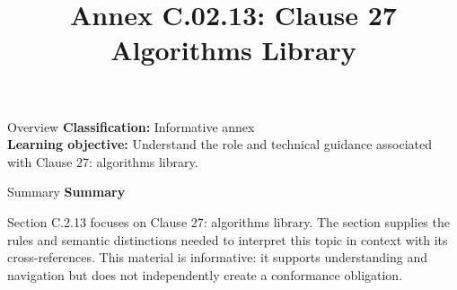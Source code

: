 \documentclass[10pt,letterpaper]{article}
\title{Annex C.02.13: Clause 27 Algorithms Library}
\author{}
\date{}
\begin{document}
\maketitle
\begin{CornellOverviewBox}{Overview}
\textbf{Classification:} Informative annex\\[2pt]
\textbf{Learning objective:} Understand the role and technical guidance associated with Clause 27: algorithms library.
\end{CornellOverviewBox}\begin{CornellSummaryBox}{Summary}
{\sffamily\bfseries\color{Accent} Summary}\par\vspace{3pt}Section C.2.13 focuses on Clause 27: algorithms library. The section supplies the rules and semantic distinctions needed to interpret this topic in context with its cross-references. This material is informative: it supports understanding and navigation but does not independently create a conformance obligation.
\end{CornellSummaryBox}
\end{document}
